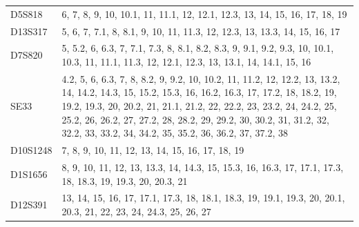 \begin{theappendices}
\begin{table}
\begin{tabularx}{\textwidth}{lX}
  D5S818 &                                                                                                                                                                                                                                                                                   6, 7, 8, 9, 10, 10.1, 11, 11.1, 12, 12.1, 12.3, 13, 14, 15, 16, 17, 18, 19 \\
 D13S317 &                                                                                                                                                                                                                                                                                    5, 6, 7, 7.1, 8, 8.1, 9, 10, 11, 11.3, 12, 12.3, 13, 13.3, 14, 15, 16, 17 \\
  D7S820 &                                                                                                                                                                                                                  5, 5.2, 6, 6.3, 7, 7.1, 7.3, 8, 8.1, 8.2, 8.3, 9, 9.1, 9.2, 9.3, 10, 10.1, 10.3, 11, 11.1, 11.3, 12, 12.1, 12.3, 13, 13.1, 14, 14.1, 15, 16 \\
    SE33 &  4.2, 5, 6, 6.3, 7, 8, 8.2, 9, 9.2, 10, 10.2, 11, 11.2, 12, 12.2, 13, 13.2, 14, 14.2, 14.3, 15, 15.2, 15.3, 16, 16.2, 16.3, 17, 17.2, 18, 18.2, 19, 19.2, 19.3, 20, 20.2, 21, 21.1, 21.2, 22, 22.2, 23, 23.2, 24, 24.2, 25, 25.2, 26, 26.2, 27, 27.2, 28, 28.2, 29, 29.2, 30, 30.2, 31, 31.2, 32, 32.2, 33, 33.2, 34, 34.2, 35, 35.2, 36, 36.2, 37, 37.2, 38 \\
D10S1248 &                                                                                                                                                                                                                                                                                                              7, 8, 9, 10, 11, 12, 13, 14, 15, 16, 17, 18, 19 \\
 D1S1656 &                                                                                                                                                                                                                                                   8, 9, 10, 11, 12, 13, 13.3, 14, 14.3, 15, 15.3, 16, 16.3, 17, 17.1, 17.3, 18, 18.3, 19, 19.3, 20, 20.3, 21 \\
 D12S391 &                                                                                                                                                                                                                                             13, 14, 15, 16, 17, 17.1, 17.3, 18, 18.1, 18.3, 19, 19.1, 19.3, 20, 20.1, 20.3, 21, 22, 23, 24, 24.3, 25, 26, 27 \\

\end{tabularx}
\end{table}
\end{theappendices}

